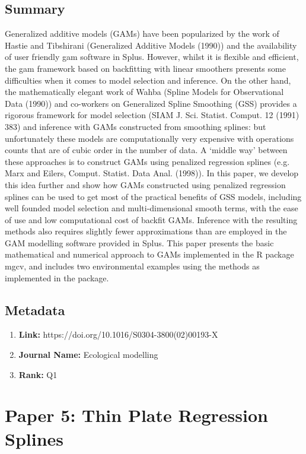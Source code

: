 \documentclass[10pt, oneside]{article}
\begin{document}
\subsection*{Summary}
Generalized additive models (GAMs) have been popularized by the work of Hastie and Tibshirani (Generalized Additive Models (1990))
and the availability of user friendly gam software in Splus. However, whilst it is flexible and efficient, the gam framework
based on backfitting with linear smoothers presents some difficulties when it comes to model selection and inference. On the
other hand, the mathematically elegant work of Wahba (Spline Models for Observational Data (1990)) and co-workers on Generalized
Spline Smoothing (GSS) provides a rigorous framework for model selection (SIAM J. Sci. Statist. Comput. 12 (1991) 383) and
inference with GAMs constructed from smoothing splines: but unfortunately these models are computationally very expensive
with operations counts that are of cubic order in the number of data. A ‘middle way’ between these approaches is to construct
GAMs using penalized regression splines (e.g. Marx and Eilers, Comput. Statist. Data Anal. (1998)). In this paper, we develop
this idea further and show how GAMs constructed using penalized regression splines can be used to get most of the practical
benefits of GSS models, including well founded model selection and multi-dimensional smooth terms, with the ease of use and
low computational cost of backfit GAMs. Inference with the resulting methods also requires slightly fewer approximations
than are employed in the GAM modelling software provided in Splus. This paper presents the basic mathematical and numerical
approach to GAMs implemented in the R package mgcv, and includes two environmental examples using the methods as implemented
in the package.
\cite{wood2002gams}

\subsection*{Metadata}
\begin{enumerate}
	\item \textbf{Link:} https://doi.org/10.1016/S0304-3800(02)00193-X
	\item \textbf{Journal Name:} Ecological modelling
	\item \textbf{Rank:} Q1
\end{enumerate}

\section*{Paper 5: Thin Plate Regression Splines}
\end{document}
